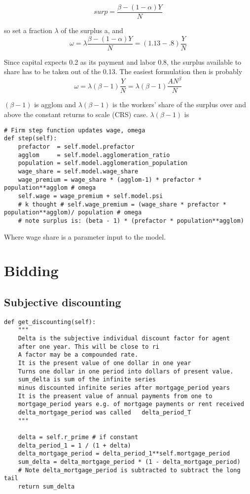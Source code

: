 \[surp= \frac{\beta -(1-\alpha)Y}{N} \] 

 so set a fraction $\lambda$ of the surplus a, and 
 \[\omega= \lambda\frac{\beta -(1-\alpha)Y}{N}= (1.13-.8) \frac{Y}{N} \] 

 Since capital expects 0.2 as its payment and labor 0.8, the surplus available to share has to be taken out of the 0.13. The easiest formulation then is probably 
 \[\omega= \lambda(\beta -1) \frac{Y}{N} =\lambda(\beta -1) \frac{AN^\beta}{N} \] 
 

$(\beta -1)$ is agglom and  $\lambda(\beta -1)$ is the workers' share of the surplus over and above the constant returns to scale (CRS) case.   $\lambda(\beta -1)$ is 

\begin{lstlisting}
# Firm step function updates wage, omega
def step(self):
    prefactor  = self.model.prefactor
    agglom     = self.model.agglomeration_ratio
    population = self.model.agglomeration_population
    wage_share = self.model.wage_share  
    wage_premium = wage_share * (agglom-1) * prefactor * population**agglom # omega
    self.wage = wage_premium + self.model.psi
    # k thought # self.wage_premium = (wage_share * prefactor * population**agglom)/ population # omega    
    # note surplus is: (beta - 1) * (prefactor * population**agglom)
\end{lstlisting}

Where wage share is a parameter input to the model.

\section{Bidding}
\subsection{Subjective discounting}
\begin{lstlisting}
def get_discounting(self):
    """
    Delta is the subjective individual discount factor for agent
    after one year. This will be close to ri
    A factor may be a compounded rate.
    It is the present value of one dollar in one year 
    Turns one dollar in one period into dollars of present value.
    sum_delta is sum of the infinite series 
    minus discounted infinite series after mortgage_period years
    It is the preasent value of annual payments from one to 
    mortgage_period years e.g. of mortgage payments or rent received
    delta_mortgage_period was called   delta_period_T
    """
    
    delta = self.r_prime # if constant 
    delta_period_1 = 1 / (1 + delta) 
    delta_mortgage_period = delta_period_1**self.mortgage_period
    sum_delta = delta_mortgage_period * (1 - delta_mortgage_period)
    # Note delta_mortgage_period is subtracted to subtract the long tail
    return sum_delta
\end{lstlisting}

